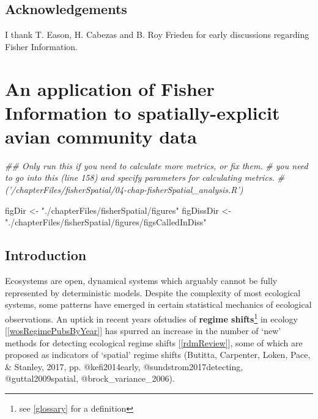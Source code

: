 \documentclass[12pt,twoside,openany]{reedthesis}
\newenvironment{Shaded}{\begin{snugshade}}{\end{snugshade}}
\newcommand{\CommentTok}[1]{\textcolor[rgb]{0.56,0.35,0.01}{\textit{#1}}}
\newcommand{\NormalTok}[1]{#1}
\newcommand{\StringTok}[1]{\textcolor[rgb]{0.31,0.60,0.02}{#1}}
\begin{document}
\hypertarget{acknowledgements}{%
\section{Acknowledgements}\label{acknowledgements}}

I thank T. Eason, H. Cabezas and B. Roy Frieden for early discussions regarding Fisher Information.

\hypertarget{fisherSpatial}{%
\chapter{An application of Fisher Information to spatially-explicit avian community data}\label{fisherSpatial}}
\begin{Shaded}
\begin{Highlighting}[]
\CommentTok{## Only run this if you need to calculate more metrics, or fix them.}
\CommentTok{# you need to go into this (line 158) and specify parameters for calculating metrics.}
\CommentTok{# ('/chapterFiles/fisherSpatial/04-chap-fisherSpatial_analysis.R')}
\end{Highlighting}
\end{Shaded}
\begin{Shaded}
\begin{Highlighting}[]
\NormalTok{figDir <-}\StringTok{ "./chapterFiles/fisherSpatial/figures"}
\NormalTok{figDissDir <-}\StringTok{ "./chapterFiles/fisherSpatial/figures/figsCalledInDiss"}
\end{Highlighting}
\end{Shaded}
\hypertarget{introduction-2}{%
\section{Introduction}\label{introduction-2}}

Ecosystems are open, dynamical systems which arguably cannot be fully represented by deterministic models. Despite the complexity of most ecological systems, some patterns have emerged in certain statistical mechanics of ecological observations. An uptick in recent years ofstudies of \textbf{regime shifts}\footnote{see \ref{glossary} for a definition} in ecology {[}\ref{wosRegimePubsByYear}{]} has spurred an increase in the number of `new' methods for detecting ecological regime shifts {[}\ref{rdmReview}{]}, some of which are proposed as indicators of `spatial' regime shifts (Butitta, Carpenter, Loken, Pace, \& Stanley, 2017, pp. @kefi2014early, @sundstrom2017detecting, @guttal2009spatial, @brock\_variance\_2006).
\end{document}
